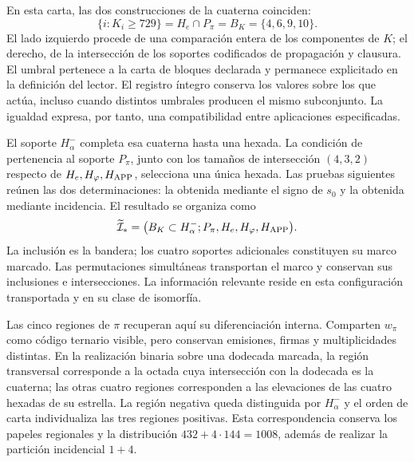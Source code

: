 En esta carta, las dos construcciones de la cuaterna coinciden:
\begin{equation}
 \{i:K_i\geq729\}
 =H_e\cap P_\pi=B_K=\{4,6,9,10\}.
 \label{inc-ampl-cuaterna}
\end{equation}
El lado izquierdo procede de una comparación entera de los componentes
de $K$; el derecho, de la intersección de los soportes codificados de
propagación y clausura. El umbral pertenece a la carta de bloques
declarada y permanece explicitado en la definición del lector. El
registro íntegro conserva los valores sobre los que actúa, incluso cuando
distintos umbrales producen el mismo subconjunto. La igualdad expresa,
por tanto, una compatibilidad entre aplicaciones especificadas.

El soporte $H^-_\alpha$ completa esa cuaterna hasta una hexada. La
condición de pertenencia al soporte $P_\pi$, junto con los tamaños de
intersección $(4,3,2)$ respecto de $H_e,H_\varphi,H_{\rm APP}$,
selecciona una única hexada. Las pruebas siguientes reúnen las dos
determinaciones: la obtenida mediante el signo de $s_0$ y la obtenida
mediante incidencia. El resultado se organiza como
\begin{equation}
 \widetilde{\mathcal I}_*
 =\bigl(B_K\subset H^-_\alpha;
         P_\pi,H_e,H_\varphi,H_{\rm APP}\bigr).
 \label{inc-ampl-marco}
\end{equation}
La inclusión es la bandera; los cuatro soportes adicionales constituyen
su marco marcado. Las permutaciones simultáneas transportan el marco y
conservan sus inclusiones e intersecciones. La información relevante reside
en esta configuración transportada y en su clase de isomorfía.

Las cinco regiones de $\pi$ recuperan aquí su diferenciación interna.
Comparten $w_\pi$ como código ternario visible, pero conservan emisiones,
firmas y multiplicidades distintas. En la realización binaria sobre una
dodecada marcada, la región transversal corresponde a la octada cuya
intersección con la dodecada es la cuaterna; las otras cuatro regiones
corresponden a las elevaciones de las cuatro hexadas de su estrella. La
región negativa queda distinguida por $H^-_\alpha$ y el orden de carta
individualiza las tres regiones positivas. Esta correspondencia conserva
los papeles regionales y la distribución $432+4\cdot144=1008$, además
de realizar la partición incidencial $1+4$.

